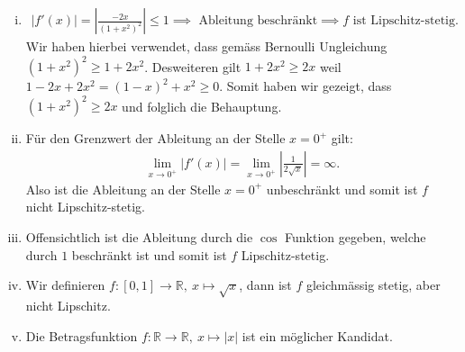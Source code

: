 \documentclass[a4paper, 20]{exam}
\begin{document}
\begin{solution} 
\begin{enumerate}[i)]

\item \begin{align*}
|f'(x)| = \left| \frac{-2x}{(1+x^2)^2}\right| \leq 1 \implies \text{ Ableitung beschränkt} \implies f \text{ ist Lipschitz-stetig}.
\end{align*}
Wir haben hierbei verwendet, dass gemäss Bernoulli Ungleichung $(1+x^2)^2 \geq 1 + 2x^2$. Desweiteren gilt $1+2x^2 \geq 2x$ weil $1-2x+2x^2 = (1-x)^2 + x^2 \geq 0$. Somit haben wir gezeigt, dass $(1+x^2)^2 \geq 2x$ und folglich die Behauptung. 
\item Für den Grenzwert der Ableitung an der Stelle $x=0^+$ gilt:
\begin{align*}
\lim_{x \rightarrow 0^+} |f'(x)| = \lim_{x \rightarrow 0^+} \left| \frac{1}{2 \sqrt{x}} \right| = \infty.
\end{align*}
Also ist die Ableitung an der Stelle $x=0^+$ unbeschränkt und somit ist $f$ nicht Lipschitz-stetig.
\item Offensichtlich ist die Ableitung durch die $\cos$ Funktion gegeben, welche durch $1$ beschränkt ist und somit ist $f$ Lipschitz-stetig.
\item Wir definieren $f: [0,1] \longrightarrow \mathbb{R}, \ x \longmapsto \sqrt{x}$, dann ist $f$ gleichmässig stetig, aber nicht Lipschitz.
\item Die Betragsfunktion $f: \mathbb{R} \longrightarrow \mathbb{R}, \ x \longmapsto |x|$ ist ein möglicher Kandidat. 
\end{enumerate}


\end{solution}
\end{document}
